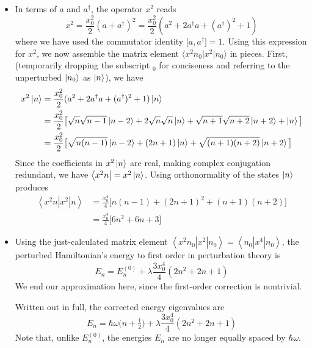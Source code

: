 \documentclass[11pt, a4paper]{article}
\newcommand{\Ham}{Hamiltonian\xspace}
\newcommand{\bmel}[3]{\big \langle {#1} \big | {#2} \big | {#3} \big \rangle}  %
\newcommand{\threebraket}[3]{\left \langle {#1} \left | {#2} \right | {#3} \right \rangle}  %
\begin{document}
\begin{itemize}
	\item In terms of $ a $ and $ a^{\dagger} $, the operator $ x^{2} $ reads
	\begin{equation*}
		x^{2} = \frac{x_{0}^{2}}{2}(a+a^{\dagger})^{2} = \frac{x_{0}^{2}}{2}(a^{2} + 2a^{\dagger}a + (a^{\dagger})^{2} + 1)
	\end{equation*}
	where we have used the commutator identity $ \big[a, a^{\dagger}\big] = 1 $. Using this expression for $ x^{2} $, we now assemble the matrix element $ \bmel{x^{2}n_{0}}{x^{2}}{n_{0}} $ in pieces. First, (temporarily dropping the subscript $ _{0} $ for conciseness and referring to the unperturbed $ \ket{n_{0}} $ as $ \ket{n} $), we have
	\begin{align*}
		 x^{2} \ket{n} &= \frac{x_{0}^{2}}{2}(a^{2} + 2a^{\dagger}a + (a^{\dagger})^{2} + 1)\ket{n} \\
		&= \frac{x_{0}^{2}}{2}\big[\sqrt{n}\sqrt{n-1}\ket{n-2} + 2\sqrt{n}\sqrt{n}\ket{n} + \sqrt{n+1}\sqrt{n+2}\ket{n+2} + \ket{n}\big]\\
		& = \frac{x_{0}^{2}}{2}\big[\sqrt{n(n-1)}\ket{n-2}+(2n+1)\ket{n}+\sqrt{(n+1)(n+2)}\ket{n+2}\big]
	\end{align*}
	Since the coefficients in $ x^{2} \ket{n} $ are real, making complex conjugation redundant, we have $ \bra{x^{2}n} = x^{2} \ket{n} $. Using orthonormality of the states $ \ket{n} $ produces
	\begin{align*}
		\threebraket{x^{2}n}{x^{2}}{n} &= \frac{x_{0}^{4}}{4}\big[n(n-1) + (2n+1)^{2} + (n+1)(n+2)\big]\\
		&= \frac{x_{0}^{4}}{4}\big[6n^{2} + 6n + 3\big]
	\end{align*}
	
	\item Using the just-calculated matrix element $ \threebraket{x^{2}n_{0}}{x^{2}}{n_{0}} = \threebraket{n_{0}}{x^{4}}{n_{0}} $, the perturbed \Ham's energy to first order in perturbation theory is
	\begin{equation*}
		E_{n} = E^{(0)}_{n} + \lambda \frac{3x_{0}^{4}}{4}(2n^{2} + 2n + 1)
	\end{equation*}
	We end our approximation here, since the first-order correction is nontrivial.
	
	Written out in full, the corrected energy eigenvalues are
	\begin{equation*}
		E_{n} = \hbar \omega\big(n + \tfrac{1}{2}\big) + \lambda \frac{3x_{0}^{4}}{4}(2n^{2} + 2n + 1)
	\end{equation*}
	Note that, unlike $ E^{(0)}_{n} $, the energies $ E_{n} $ are no longer equally spaced by $ \hbar \omega $.
\end{itemize}
\end{document}
